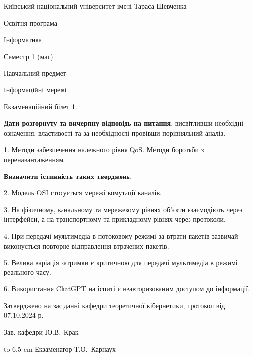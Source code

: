 \documentclass[12pt, ukrainian]{article}
\begin{document}
{{\begin {scriptsize}\par
{ \center  Київський національний університет імені Тараса Шевченка \par}
{\parbox {5 cm}{Освітня програма \hfill}{\parbox {7 cm}{Інформатика\hfill}}\parbox {6 cm}{\hfill Семестр 1 (маг)}}\par
{\parbox {5 cm} {Навчальний предмет \hfill}\parbox {7 cm}{Інформаційні мережі \hfill}\parbox {6cm}{\hfill}\par}\vspace{-15pt} \end{scriptsize}}{\center Екзаменаційний білет \No \textbf { 1 }\par}}
{
\qquad\textbf{Дати розгорнуту та вичерпну відповідь на питання}, висвітливши необхідні означення, властивості та за необхідності провівши порівняльний аналіз.

1. Методи забезпечення належного рівня QoS. Методи боротьби з перенавантаженням.



\qquad\textbf{Визначити істинність таких тверджень}.

2. Модель OSI стосується мережі комутації каналів.


3. На фізичному, канальному та мережевому рівнях об'єкти взаємодіють через інтерфейси, а на транспортному та прикладному рівнях через протоколи.


4. При передачі мультимедіа в потоковому режимі за втрати пакетів зазвичай виконується повторне відправлення втрачених пакетів.


5. Велика варіація затримки є критичною для передачі мультимедіа в режимі реального часу.


6. Використання ChatGPT на іспиті є неавторизованим доступом до інформації.

}
{\smallskip\smallskip \begin {scriptsize} Затверджено на засіданні кафедри теоретичної кібернетики, протокол   від   07.10.2024 р.\par\smallskip\smallskip\smallskip\smallskip
{\parbox {6.5 cm} {Зав. кафедри \dotfill Ю.В.~Крак}}\hspace {0.7cm} {\hbox to 6.5 cm { Екзаменатор \dotfill Т.О.~Карнаух}} \end{scriptsize}}
\end{document}
